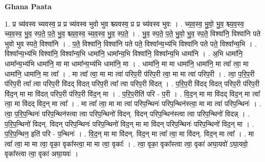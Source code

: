 \documentclass[17pt]{extarticle}
\begin{document}
\textbf{Ghana Paata } \newline

1. प्र च्य॑वस्व च्यवस्व॒ प्र प्र च्य॑वस्व भुवो भुव श्च्यवस्व॒ प्र प्र च्य॑वस्व भुवः । . च्य॒व॒स्व॒ भु॒वो॒ भु॒व॒ श्च्य॒व॒स्व॒ च्य॒व॒स्व॒ भु॒व॒ स्प॒ते॒ प॒ते॒ भु॒व॒ श्च्य॒व॒स्व॒ च्य॒व॒स्व॒ भु॒व॒ स्प॒ते॒ । . भु॒व॒ स्प॒ते॒ प॒ते॒ भु॒वो॒ भु॒व॒ स्प॒ते॒ विश्वा॑नि॒ विश्वा॑नि पते भुवो भुव स्पते॒ विश्वा॑नि । . प॒ते॒ विश्वा॑नि॒ विश्वा॑नि पते पते॒ विश्वा᳚न्य॒भ्य॑भि विश्वा॑नि पते पते॒ विश्वा᳚न्य॒भि । . विश्वा᳚न्य॒भ्य॑भि विश्वा॑नि॒ विश्वा᳚न्य॒भि धामा॑नि॒ धामा᳚न्य॒भि विश्वा॑नि॒ विश्वा᳚न्य॒भि धामा॑नि । . अ॒भि धामा॑नि॒ धामा᳚न्य॒भ्य॑भि धामा॑नि॒ मा मा धामा᳚न्य॒भ्य॑भि धामा॑नि॒ मा । . धामा॑नि॒ मा मा धामा॑नि॒ धामा॑नि॒ मा त्वा᳚ त्वा॒ मा धामा॑नि॒ धामा॑नि॒ मा त्वा᳚ । . मा त्वा᳚ त्वा॒ मा मा त्वा॑ परिप॒री प॑रिप॒री त्वा॒ मा मा त्वा॑ परिप॒री । . त्वा॒ प॒रि॒प॒री प॑रिप॒री त्वा᳚ त्वा परिप॒री वि॑दद् विदत् परिप॒री त्वा᳚ त्वा परिप॒री वि॑दत् । . प॒रि॒प॒री वि॑दद् विदत् परिप॒री प॑रिप॒री वि॑द॒न् मा मा वि॑दत् परिप॒री प॑रिप॒री वि॑द॒न् मा । . प॒रि॒प॒रीति॑ परि - प॒री । . वि॒द॒न् मा मा वि॑दद् विद॒न् मा त्वा᳚ त्वा॒ मा वि॑दद् विद॒न् मा त्वा᳚ । . मा त्वा᳚ त्वा॒ मा मा त्वा॑ परिप॒न्थिनः॑ परिप॒न्थिन॑स्त्वा॒ मा मा त्वा॑ परिप॒न्थिनः॑ । . त्वा॒ प॒रि॒प॒न्थिनः॑ परिप॒न्थिन॑स्त्वा त्वा परिप॒न्थिनो॑ विदन्. विदन् परिप॒न्थिन॑स्त्वा त्वा परिप॒न्थिनो॑ विदन्न् । . प॒रि॒प॒न्थिनो॑ विदन्. विदन् परिप॒न्थिनः॑ परिप॒न्थिनो॑ विद॒न् मा मा वि॑दन् परिप॒न्थिनः॑ परिप॒न्थिनो॑ विद॒न् मा । . प॒रि॒प॒न्थिन॒ इति॑ परि - प॒न्थिनः॑ । . वि॒द॒न् मा मा वि॑दन्. विद॒न् मा त्वा᳚ त्वा॒ मा वि॑दन्. विद॒न् मा त्वा᳚ । . मा त्वा᳚ त्वा॒ मा मा त्वा॒ वृका॒ वृका᳚स्त्वा॒ मा मा त्वा॒ वृकाः᳚ । . त्वा॒ वृका॒ वृका᳚स्त्वा त्वा॒ वृका॑ अघा॒यवो॑ ऽघा॒यवो॒ वृका᳚स्त्वा त्वा॒ वृका॑ अघा॒यवः॑ । \newline
\end{document}
